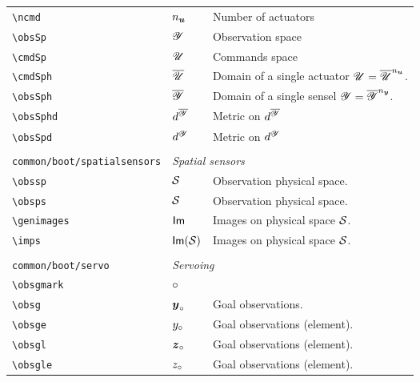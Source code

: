 \begin{longtable}{lll}
 {\color[rgb]{0.5,0.5,0.5}\texttt{\textbackslash ncmd}} & ${n_{\boldsymbol{u}}}$ &  Number of actuators\\ 
 {\color[rgb]{0.5,0.5,0.5}\texttt{\textbackslash obsSp}} & $\mathscr{Y}$ &  Observation space \\ 
 {\color[rgb]{0.5,0.5,0.5}\texttt{\textbackslash cmdSp}} & $\mathscr{U}$ &  Commands space\\ 
 {\color[rgb]{0.5,0.5,0.5}\texttt{\textbackslash cmdSph}} & $\overline{\mathscr{U}}$ &  Domain of a single actuator $\mathscr{U}=\overline{\mathscr{U}}^{n_{\boldsymbol{u}}}$.\\ 
 {\color[rgb]{0.5,0.5,0.5}\texttt{\textbackslash obsSph}} & $\overline{\mathscr{Y}}$ &  Domain of a single sensel $\mathscr{Y}=\overline{\mathscr{Y}}^{n_{\boldsymbol{y}}}$.\\ 
 {\color[rgb]{0.5,0.5,0.5}\texttt{\textbackslash obsSphd}} & $d^{\overline{\mathscr{Y}}}$ &  Metric on $d^{\overline{\mathscr{Y}}}$\\ 
 {\color[rgb]{0.5,0.5,0.5}\texttt{\textbackslash obsSpd}} & $d^{\mathscr{Y}}$ &  Metric on $d^{\mathscr{Y}}$\\ 
  &  & \\ 
 {\color[rgb]{0.5,0.5,0.5}\texttt{common/boot/spatialsensors}} & \multicolumn{2}{l}{\emph{Spatial sensors}}\\ 
 \hline
{\color[rgb]{0.5,0.5,0.5}\texttt{\textbackslash obssp}} & $\obssp$ &  Observation physical space.\\ 
 {\color[rgb]{0.5,0.5,0.5}\texttt{\textbackslash obsps}} & $\obsps$ &  Observation physical space.\\ 
 {\color[rgb]{0.5,0.5,0.5}\texttt{\textbackslash genimages}} & $\mathsf{Im}$ &  Images on physical space $\obsps$.\\ 
 {\color[rgb]{0.5,0.5,0.5}\texttt{\textbackslash imps}} & $\imps$ &  Images on physical space $\obsps$.\\ 
  &  & \\ 
 {\color[rgb]{0.5,0.5,0.5}\texttt{common/boot/servo}} & \multicolumn{2}{l}{\emph{Servoing}}\\ 
 \hline
{\color[rgb]{0.5,0.5,0.5}\texttt{\textbackslash obsgmark}} & $\circ$ & \\ 
 {\color[rgb]{0.5,0.5,0.5}\texttt{\textbackslash obsg}} & $\boldsymbol{y}_{\circ}$ &  Goal observations.\\ 
 {\color[rgb]{0.5,0.5,0.5}\texttt{\textbackslash obsge}} & $y_{\circ}$ &  Goal observations (element).\\ 
 {\color[rgb]{0.5,0.5,0.5}\texttt{\textbackslash obsgl}} & $\boldsymbol{z}_{\circ}$ &  Goal observations (element).\\ 
 {\color[rgb]{0.5,0.5,0.5}\texttt{\textbackslash obsgle}} & $z_{\circ}$ &  Goal observations (element).\\ 

\end{longtable}
